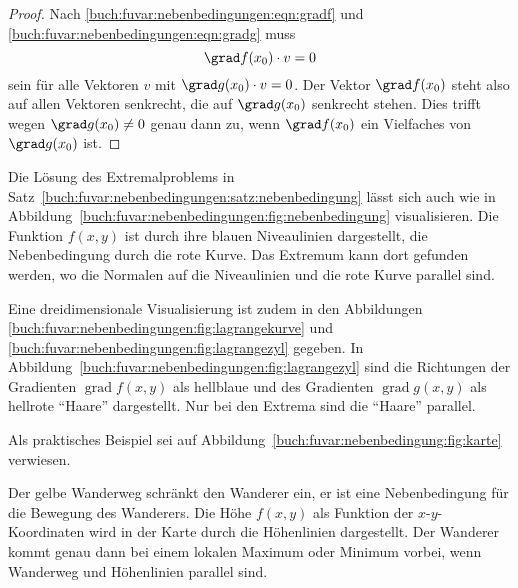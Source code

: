 \begin{proof}
Nach
\eqref{buch:fuvar:nebenbedingungen:eqn:gradf}
und
\eqref{buch:fuvar:nebenbedingungen:eqn:gradg}
muss 
\[
\grad f(x_0)\cdot v = 0
\]
sein für alle Vektoren $v$ mit $\grad g(x_0)\cdot v= 0$.
Der Vektor $\grad f(x_0)$ steht also auf allen Vektoren senkrecht, die
auf $\grad g(x_0)$ senkrecht stehen.
Dies trifft wegen $\grad g(x_0)\ne 0$ genau dann zu, wenn $\grad f(x_0)$
ein Vielfaches von $\grad g(x_0)$ ist.
\end{proof}

Die Lösung des Extremalproblems in
Satz~\ref{buch:fuvar:nebenbedingungen:satz:nebenbedingung}
lässt sich auch wie in
Abbildung~\ref{buch:fuvar:nebenbedingungen:fig:nebenbedingung}
visualisieren.
Die Funktion $f(x,y)$ ist durch ihre blauen Niveaulinien 
dargestellt, die Nebenbedingung durch die rote Kurve.
Das Extremum kann dort gefunden werden, wo die Normalen auf die
Niveaulinien und die rote Kurve parallel sind.


Eine dreidimensionale Visualisierung ist zudem in den 
Abbildungen
\ref{buch:fuvar:nebenbedingungen:fig:lagrangekurve}
und
\ref{buch:fuvar:nebenbedingungen:fig:lagrangezyl}
gegeben.
In
Abbildung~\ref{buch:fuvar:nebenbedingungen:fig:lagrangezyl}
sind die Richtungen der Gradienten $\operatorname{grad} f(x,y)$ als
hellblaue und des Gradienten $\operatorname{grad}g(x,y)$ als hellrote
``Haare'' dargestellt.
Nur bei den Extrema sind die ``Haare'' parallel.

Als praktisches Beispiel sei auf
Abbildung~\ref{buch:fuvar:nebenbedingung:fig:karte}
verwiesen.

Der {\color{gelb}gelbe} Wanderweg schränkt den Wanderer ein,
er ist eine Nebenbedingung für die Bewegung des Wanderers.
Die Höhe $f(x,y)$ als Funktion der $x$-$y$-Koordinaten wird in
der Karte durch die Höhenlinien dargestellt.
Der Wanderer kommt genau dann bei einem lokalen Maximum oder
Minimum vorbei, wenn Wanderweg und Höhenlinien parallel sind.

